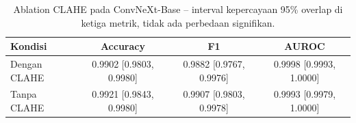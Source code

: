 \begin{table}[htbp]
\centering
\caption{Ablation CLAHE pada ConvNeXt-Base -- interval kepercayaan 95\% overlap di ketiga metrik, tidak ada perbedaan signifikan.}
\label{tab:clahe-ablation}
\begin{tabular}{lccc}
\toprule
Kondisi & Accuracy & F1 & AUROC \\
\midrule
Dengan CLAHE & 0.9902 [0.9803, 0.9980] & 0.9882 [0.9767, 0.9976] & 0.9998 [0.9993, 1.0000] \\
Tanpa CLAHE & 0.9921 [0.9843, 0.9980] & 0.9907 [0.9803, 0.9978] & 0.9993 [0.9979, 1.0000] \\
\bottomrule
\end{tabular}
\end{table}
